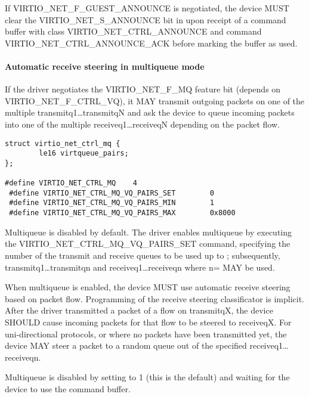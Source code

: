 If VIRTIO_NET_F_GUEST_ANNOUNCE is negotiated, the device MUST clear the
VIRTIO_NET_S_ANNOUNCE bit in  upon receipt of a command buffer
with class VIRTIO_NET_CTRL_ANNOUNCE and command VIRTIO_NET_CTRL_ANNOUNCE_ACK
before marking the buffer as used.

\paragraph{Automatic receive steering in multiqueue mode}\label{sec:Device Types / Network Device / Device Operation / Control Virtqueue / Automatic receive steering in multiqueue mode}

If the driver negotiates the VIRTIO_NET_F_MQ feature bit (depends
on VIRTIO_NET_F_CTRL_VQ), it MAY transmit outgoing packets on one
of the multiple transmitq1\ldots transmitqN and ask the device to
queue incoming packets into one of the multiple receiveq1\ldots receiveqN
depending on the packet flow.

\begin{lstlisting}
struct virtio_net_ctrl_mq {
        le16 virtqueue_pairs;
};

#define VIRTIO_NET_CTRL_MQ    4
 #define VIRTIO_NET_CTRL_MQ_VQ_PAIRS_SET        0
 #define VIRTIO_NET_CTRL_MQ_VQ_PAIRS_MIN        1
 #define VIRTIO_NET_CTRL_MQ_VQ_PAIRS_MAX        0x8000
\end{lstlisting}

Multiqueue is disabled by default. The driver enables multiqueue by
executing the VIRTIO_NET_CTRL_MQ_VQ_PAIRS_SET command, specifying
the number of the transmit and receive queues to be used up to
; subsequently,
transmitq1\ldots transmitqn and receiveq1\ldots receiveqn where
n= MAY be used.

When multiqueue is enabled, the device MUST use automatic receive steering
based on packet flow. Programming of the receive steering
classificator is implicit. After the driver transmitted a packet of a
flow on transmitqX, the device SHOULD cause incoming packets for that flow to
be steered to receiveqX. For uni-directional protocols, or where
no packets have been transmitted yet, the device MAY steer a packet
to a random queue out of the specified receiveq1\ldots receiveqn.

Multiqueue is disabled by setting  to 1 (this is
the default) and waiting for the device to use the command buffer.


